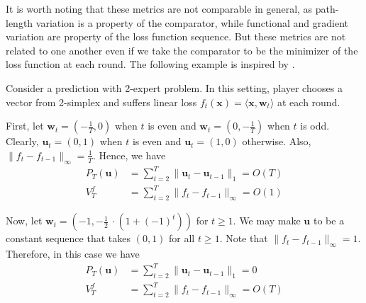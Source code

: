 \documentclass[12pt, a4paper]{report}
\begin{document}
It is worth noting that these metrics are not comparable in general, as path-length variation is a property of the comparator, while functional and gradient variation are property of the loss function sequence. But these metrics are not related to one another even if we take the comparator to be the minimizer of the loss function at each round. The following example is inspired by \cite{Jadbabaie2015OnlineO}.
\begin{exmp}
Consider a prediction with 2-expert problem. In this setting, player chooses a vector from 2-simplex and suffers linear loss $f_t(\mathbf{x}) = \langle \mathbf{x}, \mathbf{w}_t \rangle$ at each round. 

First, let $\mathbf{w}_t = (-\frac{1}{T}, 0)$ when $t$ is even and $\mathbf{w}_t = (0, -\frac{1}{T})$ when $t$ is odd. Clearly, $\mathbf{u}_t = (0, 1)$ when $t$ is even and $\mathbf{u}_t = (1, 0)$ otherwise. Also, $\lVert f_t - f_{t-1} \rVert_{\infty} = \frac{1}{T}$. Hence, we have 
\begin{align*}
    P_T(\mathbf{u}) &= \sum_{t=2}^T \lVert \mathbf{u}_t - \mathbf{u}_{t-1} \rVert_{1} = O(T) \\
    V_T^f &= \sum_{t=2}^T \lVert f_t - f_{t-1} \rVert_{\infty} = O(1)
\end{align*}

Now, let $\mathbf{w}_t = (-1, -\frac{1}{2}\ \cdot (1 + (-1)^t))$ for $t \geq 1$. We may make $\mathbf{u}$ to be a constant sequence that takes $(0, 1)$ for all $t \geq 1$. Note that $\lVert f_t - f_{t-1} \rVert_{\infty} = 1$. Therefore, in this case we have
\begin{align*}
    P_T(\mathbf{u}) &= \sum_{t=2}^T \lVert \mathbf{u}_t - \mathbf{u}_{t-1} \rVert_{1} = 0 \\
    V_T^f &= \sum_{t=2}^T \lVert f_t - f_{t-1} \rVert_{\infty} = O(T)
\end{align*}
\end{exmp}
\end{document}
